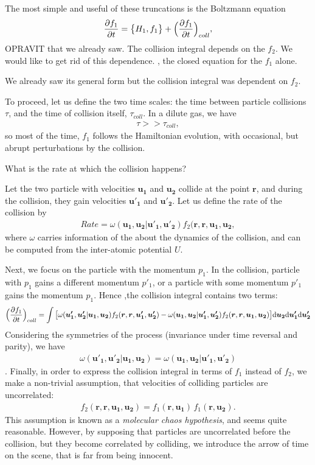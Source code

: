 The most simple and useful of these truncations is the Boltzmann equation
\begin{align*}
\frac{\partial f_1}{\partial t} = \big\{ H_1, f_1 \big\} + \Big(\frac{\partial f_1}{\partial t} \Big)_{coll},
\end{align*}
OPRAVIT
that we already saw. The collision integral depends on the $f_2$. We would like to get rid of this dependence.
, the closed equation for the $f_1$ alone.

We already saw its general form
but the collision integral was dependent on $f_2$.

To proceed, let us define the two time scales:
the time between particle collisions $\tau$, and the time of collision itself, $\tau_{coll}$.
In a dilute gas, we have
\begin{align*}
\tau >> \tau_{coll},
\end{align*}
so most of the time, $f_1$ follows the Hamiltonian evolution, with occasional, but abrupt perturbations by the collision. 

What is the rate at which the collision happens?

Let the two particle with velocities $\bm{u_1}$ and $\bm{u_2}$ collide at the point $\bm{r}$, and during the collision, they gain velocities $\bm{u'_1}$ and $\bm{u'_2}$.
Let us define the rate of the collision by
\begin{align*}
Rate = \omega(\bm{u_1},\bm{u_2} | \bm{u'_1}, \bm{u'_2}) f_2(\bm{r},\bm{r},\bm{u_1},\bm{u_2},
\end{align*}
where $\omega$ carries information of the about the dynamics of the collision, and can be computed from the inter-atomic potential $U$.

Next, we focus on the particle with the momentum $p_1$.
In the collision, particle with $p_1$ gains a different momentum $p'_1$, or a particle with some momentum $p'_1$ gains the momentum $p_1$.
Hence ,the collision integral contains two terms:
\begin{align*}
\Big( \frac{\partial f_1}{\partial t} \Big)_{coll}= \int \big[ \omega(\bm{u'_1},\bm{u'_2} | \bm{u_1}, \bm{u_2}) f_2(\bm{r},\bm{r}, \bm{u'_1},\bm{u'_2}) - \omega(\bm{u_1},\bm{u_2} | \bm{u'_1}, \bm{u'_2}) f_2(\bm{r},\bm{r}, \bm{u_1}, \bm{u_2}) \big] \mathrm{d} \bm{u_2} \mathrm{d} \bm{u'_1} \mathrm{d} \bm{u'_2}
\end{align*}
Considering the symmetries of the process (invariance under time reversal and parity), we have
\begin{align} \label{symm} 
\omega(\bm{u'_1},\bm{u'_2} | \bm{u_1}, \bm{u_2}) = \omega(\bm{u_1},\bm{u_2} | \bm{u'_1}, \bm{u'_2})
\end{align}.
Finally, in order to express the collision integral in terms of $f_1$ instead of $f_2$, we make a non-trivial assumption, that velocities of colliding particles are uncorrelated:
\begin{align} \label{chaos}
f_2(\bm{r},\bm{r},\bm{u_1},\bm{u_2}) = f_1(\bm{r},\bm{u_1})\,f_1(\bm{r},\bm{u_2}).
\end{align}
This assumption is known as a \textit{molecular chaos hypothesis}, and seems quite reasonable. However, by supposing that particles are uncorrelated before the collision, but they become correlated by colliding, we introduce the arrow of time on the scene, that is far from being innocent.

